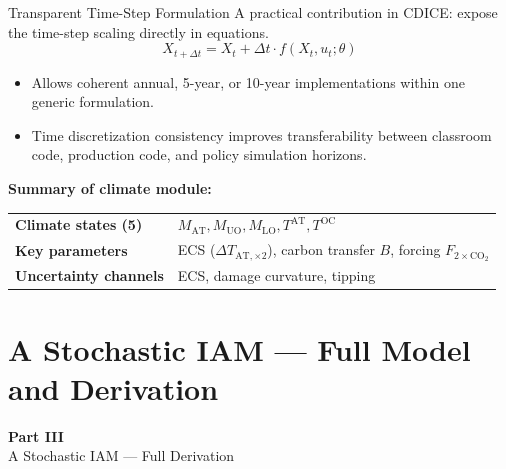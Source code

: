 \documentclass[aspectratio=169,11pt]{beamer}
\begin{document}
\begin{frame}{Transparent Time-Step Formulation}
\small
A practical contribution in CDICE: expose the time-step scaling directly in equations.
\[
X_{t+\Delta t} = X_t + \Delta t \cdot f(X_t, u_t; \theta)
\]

\begin{itemize}
    \item Allows coherent annual, 5-year, or 10-year implementations within one generic formulation.
    \item Time discretization consistency improves transferability between classroom code, production code, and policy simulation horizons.
\end{itemize}

\vspace{0.2cm}
\textbf{Summary of climate module:}
\begin{center}
\small
\begin{tabular}{ll}
\toprule
\textbf{Climate states (5)} & $M_{\mathrm{AT}}, M_{\mathrm{UO}}, M_{\mathrm{LO}}, T^{\mathrm{AT}}, T^{\mathrm{OC}}$ \\
\textbf{Key parameters} & ECS ($\Delta T_{\mathrm{AT},\times 2}$), carbon transfer $B$, forcing $F_{\mathrm{2\times CO_2}}$ \\
\textbf{Uncertainty channels} & ECS, damage curvature, tipping \\
\bottomrule
\end{tabular}
\end{center}
\end{frame}

\section{A Stochastic IAM --- Full Model and Derivation}

\begin{frame}{}
\vfill
\begin{center}
{\Huge \textcolor{uzhblue}{\textbf{Part III}}}\\[12pt]
{\LARGE A Stochastic IAM --- Full Derivation}
\end{center}
\vfill
\end{frame}
\end{document}
